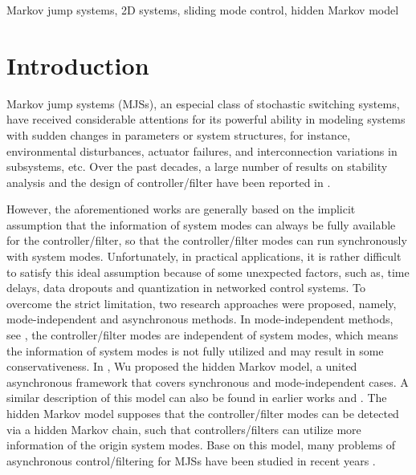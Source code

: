 \documentclass[journal,final,twocolumn]{IEEEtran}
\begin{document}

\begin{IEEEkeywords}
	Markov jump systems, 2D systems, sliding mode control, hidden Markov model
\end{IEEEkeywords}



%
\IEEEpeerreviewmaketitle
  
   

\section{Introduction}
	Markov jump systems (MJSs), an especial class of stochastic switching systems, have received considerable attentions for its powerful ability in modeling systems with sudden changes in parameters or system structures, for instance,  environmental disturbances, actuator failures, and interconnection variations in subsystems, etc. Over the past decades, a large number of results on stability analysis and the design of controller/filter have been reported in \cite{costa2006discrete, wu2014asynchronous, zhang2008analysis, shi2006designing, zhang2009stability}.
	
	However, the aforementioned works  are generally based on the implicit assumption that the information of system modes can always be  fully available for the controller/filter, so that the controller/filter modes can run synchronously with system modes. Unfortunately, in practical applications, it is rather difficult to satisfy this ideal assumption because of some unexpected factors, such as, time delays, data dropouts and quantization in networked control systems. To overcome the strict limitation, two research approaches were proposed, namely, mode-independent and asynchronous methods. In mode-independent methods, see \cite{todorov2016new,wu2005mode,dolgov2017static}, the controller/filter modes are independent of system modes, which means the information of system modes is not fully utilized and may result in some conservativeness. In \cite{wu2016passivity}, Wu proposed the hidden Markov model, a united asynchronous framework that covers synchronous and mode-independent cases. A similar description of this model can also be found in earlier works \cite{costa2006discrete} and \cite{do2014detector}. The hidden Markov model supposes that the controller/filter modes can be detected via a hidden Markov chain, such that controllers/filters can utilize more information of the origin system modes.  Base on this model, many problems of asynchronous control/filtering for MJSs have been studied in recent years \cite{de2017h,todorov2018detector,rodrigues2018detector}. 
	
\end{document}
